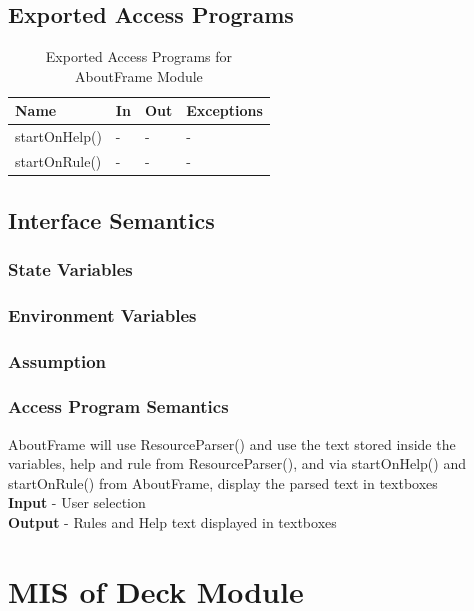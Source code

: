 \documentclass[11pt]{article}
\begin{document}
    \subsection{Exported Access Programs}
    \begin{table}[H]
    \caption{Exported Access Programs for AboutFrame Module}
    \begin{tabular}{p{4cm}p{2cm}p{2cm}p{4cm}}
    Name & In & Out & Exceptions\\
    \hline
	startOnHelp() & - & - & -\\
	\hline
   startOnRule() & - & - & -\\
    \hline
    \end{tabular}
   
    \end{table}
    
    \subsection{Interface Semantics}
    \subsubsection{State Variables}
    
    \subsubsection{Environment Variables}
	
    \subsubsection{Assumption}
    
    \subsubsection{Access Program Semantics}
    AboutFrame will use ResourceParser() and use the text stored inside the variables, help and rule from ResourceParser(), and via startOnHelp() and startOnRule() from AboutFrame, display the parsed text in textboxes \\
    \textbf{Input} - User selection\\
    \textbf{Output} - Rules and Help text displayed in textboxes 
    \newline
 	
 	
 	
 	\section{MIS of Deck Module}
     
\end{document}
